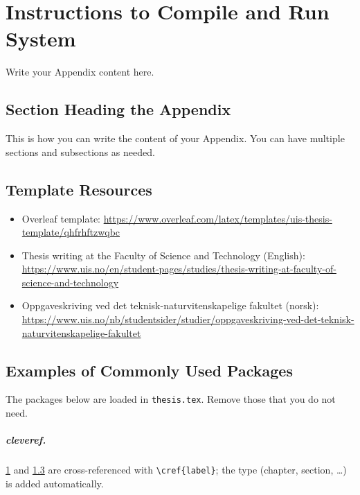 
\chapter{Instructions to Compile and Run System}
\label{apx:instructions}

Write your Appendix content here.

\section{Section Heading the Appendix}
\label{apx:instructions:section}

This is how you can write the content of your Appendix.
You can have multiple sections and subsections as needed.

\begin{instructions}
\section{Template Resources}
\label{apx:instructions:resources}

\begin{itemize}
\item Overleaf template: \url{https://www.overleaf.com/latex/templates/uis-thesis-template/qhfrhftzwqbc}
\item Thesis writing at the Faculty of Science and Technology (English): \url{https://www.uis.no/en/student-pages/studies/thesis-writing-at-faculty-of-science-and-technology}
\item Oppgaveskriving ved det teknisk-naturvitenskapelige fakultet (norsk): \url{https://www.uis.no/nb/studentsider/studier/oppgaveskriving-ved-det-teknisk-naturvitenskapelige-fakultet}
\end{itemize}

\section{Examples of Commonly Used Packages}
\label{apx:instructions:packages}

The packages below are loaded in \texttt{thesis.tex}.
Remove those that you do not need.

\paragraph{cleveref.}
\cref{apx:instructions} and \cref{apx:instructions:packages} are cross-referenced with \verb|\cref{label}|; the type (chapter, section, \dots) is added automatically.


\end{instructions}
